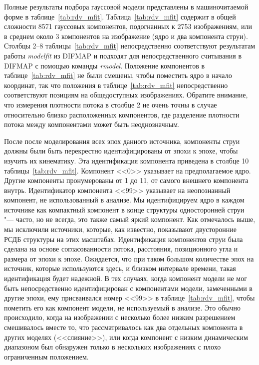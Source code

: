 Полные результаты подбора гауссовой модели представлены в машиночитаемой форме в
таблице~\ref{tab:rdv_mfit}. Таблица~\ref{tab:rdv_mfit} содержит в общей сложности 8571 гауссовых
компонентов, подогнанных к 2753 изображениям, или в среднем около 3 компонентов на изображение (ядро
и два компонента струи). Столбцы 2--8 таблицы~\ref{tab:rdv_mfit} непосредственно соответствуют
результатам работы \emph{modelfit} из DIFMAP и подходят для непосредственного считывания в DIFMAP с
помощью команды \emph{rmodel}. Положение компонентов в таблице~\ref{tab:rdv_mfit} не были смещены,
чтобы поместить ядро в начало координат, так что положения в таблице~\ref{tab:rdv_mfit}
непосредственно соответствуют позициям на общедоступных изображениях. Обратите внимание, что
измерения плотности потока в столбце 2 не очень точны в случае относительно близко расположенных
компонентов, где разделение плотности потока между компонентами может быть неоднозначным.

После после моделирования всех эпох данного источника, компоненты струи должны были быть перекрестно
идентифицированы от эпохи к эпохе, чтобы изучить их кинематику. Эта идентификация компонента
приведена в столбце 10 таблицы~\ref{tab:rdv_mfit}. Компонент <<0>> указывает на предполагаемое ядро.
Другие компоненты пронумерованы от 1 до 11, от самого внешнего компонента внутрь. Идентификатор
компонента <<99>> указывает на неопознанный компонент, не использованный в анализе. Мы
идентифицируем ядро ​​в каждом источнике как компактный компонент в конце структуры односторонней
струи "--- часто, но не всегда, это также самый яркий компонент. Как отмечалось выше, мы исключили
источники, которые, как известно, показывают двусторонние РСДБ структуры на этих масштабах.
Идентификация компонентов струи была сделана на основе согласованности потока, расстояния,
позиционного угла и размера от эпохи к эпохе. Ожидается, что при таком большом количестве эпох на
источник, которые используются здесь, и близком интервале времени, такая идентификация будет
надежной. В тех случаях, когда компонент модели не мог быть непосредственно идентифицирован с
компонентами модели, замеченными в другие эпохи, ему присваивался номер <<99>> в
таблице~\ref{tab:rdv_mfit}, чтобы пометить его как компонент модели, не используемый в анализе. Это
обычно происходило, когда на изображении с несколько более низким разрешением смешивалось вместе то,
что рассматривалось как два отдельных компонента в других моделях (<<слияние>>), или когда компонент
с низким динамическим диапазоном был обнаружен только в нескольких изображениях с плохо ограниченным
положением.

